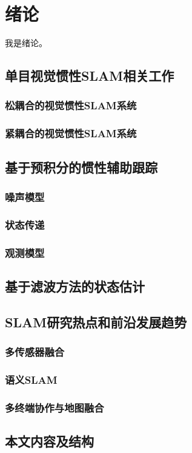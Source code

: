 \chapter{绪论}

我是绪论。

\section{单目视觉惯性SLAM相关工作}
\subsection{松耦合的视觉惯性SLAM系统}
\subsection{紧耦合的视觉惯性SLAM系统}

\section{基于预积分的惯性辅助跟踪}
\subsection{噪声模型}
\subsection{状态传递}
\subsection{观测模型}

\section{基于滤波方法的状态估计}




\section{SLAM研究热点和前沿发展趋势}
\subsection{多传感器融合}
\subsection{语义SLAM}
\subsection{多终端协作与地图融合}

\section{本文内容及结构}
